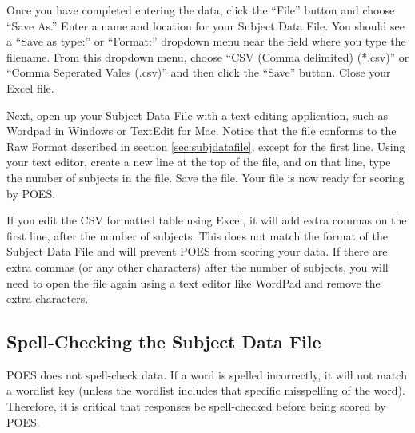 \documentclass[11pt]{article}
\numberwithin{figure}{section}
\numberwithin{table}{section}
\begin{document}
Once you have completed entering the data, click the ``File'' button and choose ``Save As.''  Enter a name and location for your Subject Data File.  You should see a ``Save as type:'' or ``Format:'' dropdown menu near the field where you type the filename.  From this dropdown menu, choose ``CSV (Comma delimited) (*.csv)'' or ``Comma Seperated Vales (.csv)'' and then click the ``Save'' button.  Close your Excel file.

Next, open up your Subject Data File with a text editing application, such as Wordpad in Windows or TextEdit for Mac.  Notice that the file conforms to the Raw Format described in section \ref{sec:subjdatafile}, except for the first line.  Using your text editor, create a new line at the top of the file, and on that line, type the number of subjects in the file.  Save the file.  Your file is now ready for scoring by POES.

If you edit the CSV formatted table using Excel, it will add extra commas on the first line, after the number of subjects.  This does not match the format of the Subject Data File and will prevent POES from scoring your data.  If there are extra commas (or any other characters) after the number of subjects, you will need to open the file again using a text editor like WordPad and remove the extra characters. 

\subsection{Spell-Checking the Subject Data File}

POES does not spell-check data.  If a word is spelled incorrectly, it will not match a wordlist key (unless the wordlist includes that specific misspelling of the word).  Therefore, it is critical that responses be spell-checked before being scored by POES.
\end{document}
